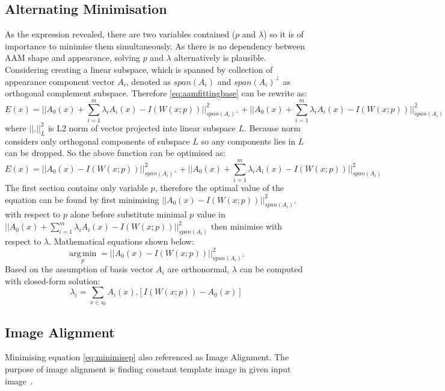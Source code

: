 \subsection{Alternating Minimisation}
As the expression revealed, there are two variables contained ($p$ and $\lambda$) so it is of importance to minimise them simultaneously. As there is no dependency between AAM shape and appearance, solving $p$ and $\lambda$ alternatively is plausible. Considering creating a linear subspace, which is spanned by collection of appearance component vector $A_i$, denoted as $span(A_i)$ and $span(A_i)^\perp$ as orthogonal complement subspace. Therefore \ref{eq:aamfittingbase} can be rewrite as:
\begin{equation} 
\label{eq:aamfittingappearancevariance}
E(x)=||A_0(x)+\sum^m_{i=1}\lambda_iA_i(x)-I(W(x;p))||^2_{span(A_i)^\perp}+||A_0(x)+\sum^m_{i=1}\lambda_iA_i(x)-I(W(x;p))||^2_{span(A_i)}
\end{equation}
where $||.||^2_L$ is L2 norm of vector projected into linear subspace $L$. Because norm considers only orthogonal components of subspace $L$ so any components lies in $L$ can be dropped. So the above function can be optimised as:
\begin{equation} 
\label{eq:aamfittingappearancevariancesubspace}
E(x)=||A_0(x)-I(W(x;p))||^2_{span(A_i)^\perp}+||A_0(x)+\sum^m_{i=1}\lambda_iA_i(x)-I(W(x;p))||^2_{span(A_i)}
\end{equation}
The first section contains only variable $p$, therefore the optimal value of the equation can be found by first minimising $||A_0(x)-I(W(x;p))||^2_{span(A_i)^\perp}$ with respect to $p$ alone before substitute minimal $p$ value in $||A_0(x)+\sum^m_{i=1}\lambda_iA_i(x)-I(W(x;p))||^2_{span(A_i)}$ then minimise with respect to $\lambda$. Mathematical equations shown below:
\begin{equation}
\label{eq:minimisep}
\operatorname*{arg\,min}_p=||A_0(x)-I(W(x;p))||^2_{span(A_i)^\perp}
\end{equation}
Based on the assumption of basis vector $A_i$ are orthonormal, $\lambda$ can be computed with closed-form solution:
\begin{equation}
\label{eq:minimiselambda}
\lambda_i=\sum_{x\in s_0}A_i(x).[I(W(x;p))-A_0(x)]
\end{equation}

\subsection{Image Alignment}
Minimising equation \ref{eq:minimisep} also referenced as Image Alignment. The purpose of image alignment is finding constant template image in given input image~\cite{Matthews2004}. 

